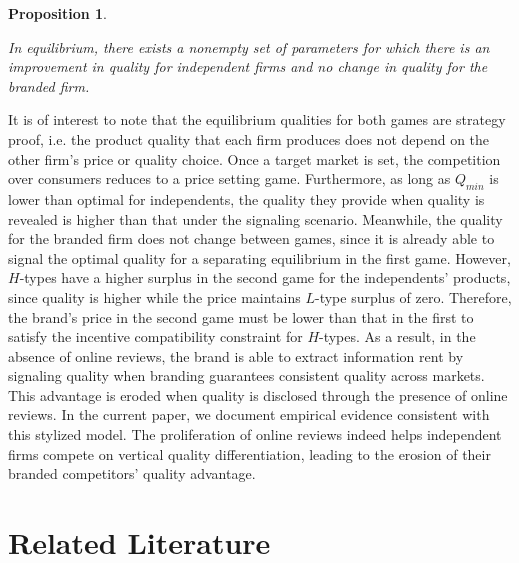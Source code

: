 \documentclass[mksc,blindrev]{informs3} %
\newtheorem{prop}{Proposition}
\begin{document}
\begin{prop}\label{thm:nonempty}
\begin{enumerate}
In equilibrium, there exists a nonempty set of parameters for which there is an improvement in quality for independent firms and no change in quality for the branded firm.
\end{enumerate}
\end{prop}

It is of interest to note that the equilibrium qualities for both games are strategy proof, i.e. the product quality that each firm produces does not depend on the other firm's price or quality choice. Once a target market is set, the competition over consumers reduces to a price setting game. Furthermore, as long as $Q_{min}$ is lower than optimal for independents, the quality they provide when quality is revealed is higher than that under the signaling scenario. Meanwhile, the quality for the branded firm does not change between games, since it is already able to signal the optimal quality for a separating equilibrium in the first game. However, $H$-types have a higher surplus in the second game for the independents' products, since quality is higher while the price maintains $L$-type surplus of zero. Therefore, the brand's price in the second game must be lower than that in the first to satisfy the incentive compatibility constraint for $H$-types. As a result, in the absence of online reviews, the brand is able to extract information rent by signaling quality when branding guarantees consistent quality across markets. This advantage is eroded when quality is disclosed through the presence of online reviews. In the current paper, we document empirical evidence consistent with this stylized model. The proliferation of online reviews indeed helps independent firms compete on vertical quality differentiation, leading to the erosion of their branded competitors' quality advantage.

\section{Related Literature} \label{sec:litreview}
\end{document}
